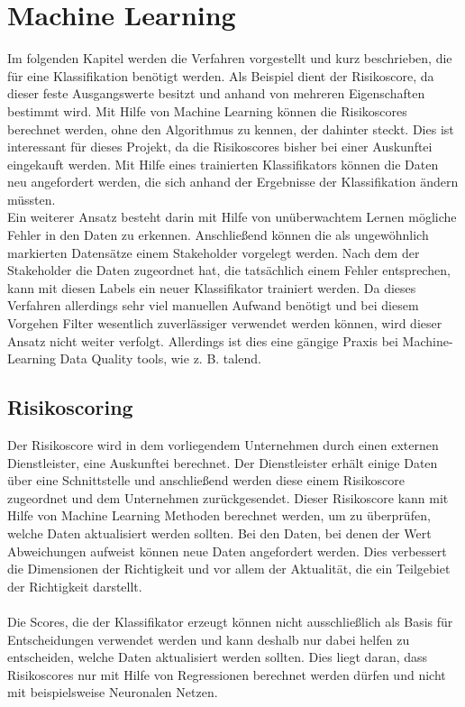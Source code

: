 \section{Machine Learning}
Im folgenden Kapitel werden die Verfahren vorgestellt und kurz beschrieben, die für eine Klassifikation benötigt werden. 
Als Beispiel dient der Risikoscore, da dieser feste Ausgangswerte besitzt und anhand von mehreren Eigenschaften bestimmt wird. 
Mit Hilfe von Machine Learning können die Risikoscores berechnet werden, ohne den Algorithmus zu kennen, der dahinter steckt. 
Dies ist interessant für dieses Projekt, da die Risikoscores bisher bei einer Auskunftei eingekauft werden.
Mit Hilfe eines trainierten Klassifikators können die Daten neu angefordert werden, die sich anhand der Ergebnisse der Klassifikation ändern müssten. 
\\
Ein weiterer Ansatz besteht darin mit Hilfe von unüberwachtem Lernen mögliche Fehler in den Daten zu erkennen.
Anschließend können die als ungewöhnlich markierten Datensätze einem Stakeholder vorgelegt werden.
Nach dem der Stakeholder die Daten zugeordnet hat, die tatsächlich einem Fehler entsprechen, kann mit diesen Labels ein neuer Klassifikator trainiert werden. 
Da dieses Verfahren allerdings sehr viel manuellen Aufwand benötigt und bei diesem Vorgehen Filter wesentlich zuverlässiger verwendet werden können, wird dieser Ansatz nicht weiter verfolgt.
Allerdings ist dies eine gängige Praxis bei Machine-Learning Data Quality tools, wie z. B. talend. 


\subsection{Risikoscoring}
Der Risikoscore wird in dem vorliegendem Unternehmen durch einen externen Dienstleister, eine Auskunftei berechnet. 
Der Dienstleister erhält einige Daten über eine Schnittstelle und anschließend werden diese einem Risikoscore zugeordnet und dem Unternehmen zurückgesendet.
Dieser Risikoscore kann mit Hilfe von Machine Learning Methoden berechnet werden, um zu überprüfen, welche Daten aktualisiert werden sollten.
Bei den Daten, bei denen der Wert Abweichungen aufweist können neue Daten angefordert werden.
Dies verbessert die Dimensionen der Richtigkeit und vor allem der Aktualität, die ein Teilgebiet der Richtigkeit darstellt.
\\ \\
Die Scores, die der Klassifikator erzeugt können nicht ausschließlich als Basis für Entscheidungen verwendet werden und kann deshalb nur dabei helfen zu entscheiden, welche Daten aktualisiert werden sollten.
Dies liegt daran, dass Risikoscores nur mit Hilfe von Regressionen berechnet werden dürfen und nicht mit beispielsweise Neuronalen Netzen.



